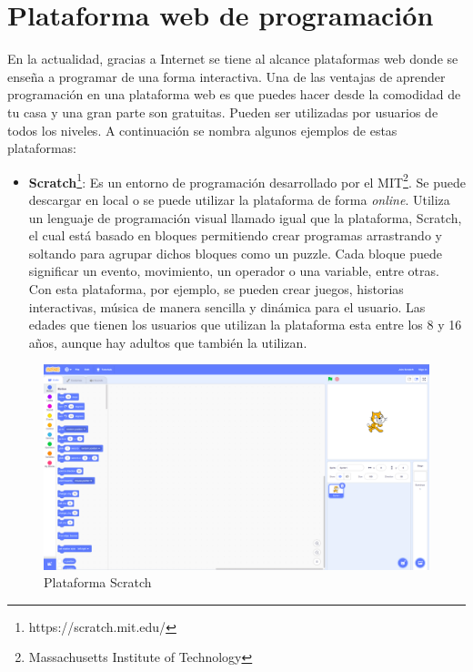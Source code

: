 \section{Plataforma web de programación}
En la actualidad, gracias a Internet se tiene al alcance plataformas web donde se enseña a programar de una forma interactiva. Una de las ventajas de aprender programación en una plataforma web es que puedes hacer desde la comodidad de tu casa y una gran parte son gratuitas. Pueden ser utilizadas por usuarios de todos los niveles. A continuación se nombra algunos ejemplos de estas plataformas:\\
\newpage
\begin{itemize}
\item \textbf{Scratch}\footnote{https://scratch.mit.edu/}: Es un entorno de programación desarrollado por el MIT\footnote{Massachusetts Institute of Technology}. Se puede descargar en local o se puede utilizar la plataforma de forma \textit{online}. Utiliza  un lenguaje de programación visual llamado igual que la plataforma, Scratch, el cual está basado en bloques permitiendo crear programas arrastrando y soltando para agrupar dichos bloques como un puzzle. Cada bloque puede significar un evento, movimiento, un operador o una variable, entre otras. Con esta plataforma, por ejemplo,  se pueden crear juegos, historias interactivas, música de manera sencilla y dinámica para el usuario. Las edades que tienen los usuarios que utilizan la plataforma esta entre los 8 y 16 años, aunque hay adultos que también la utilizan\cite{scratch}.
\end{itemize}

\begin{figure}[H]
    \centering
    \includegraphics[width=12cm, keepaspectratio]{img/scratch.png}
    \caption{Plataforma Scratch}
    \label{fig:scrach}
\end{figure}

